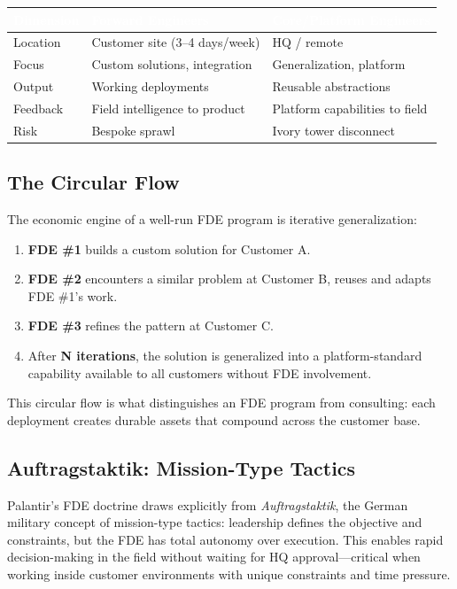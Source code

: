 \begin{center}
\begin{tabular}{L{3cm}L{5cm}L{5cm}}
\toprule
{}
\textcolor{white}{\textbf{Dimension}} &
\textcolor{white}{\textbf{Forward Engineers}} &
\textcolor{white}{\textbf{Core/Platform Engineers}} \\
\midrule
Location & Customer site (3--4 days/week) & HQ / remote \\
Focus & Custom solutions, integration & Generalization, platform \\
Output & Working deployments & Reusable abstractions \\
Feedback & Field intelligence to product & Platform capabilities to field \\
Risk & Bespoke sprawl & Ivory tower disconnect \\
\bottomrule
\end{tabular}
\end{center}

\subsection{The Circular Flow}

The economic engine of a well-run FDE program is iterative generalization:

\begin{enumerate}
    \item \textbf{FDE \#1} builds a custom solution for Customer A.
    \item \textbf{FDE \#2} encounters a similar problem at Customer B,
        reuses and adapts FDE \#1's work.
    \item \textbf{FDE \#3} refines the pattern at Customer C.
    \item After \textbf{N iterations}, the solution is generalized into a
        platform-standard capability available to all customers without
        FDE involvement.
\end{enumerate}

This circular flow is what distinguishes an FDE program from consulting:
each deployment creates durable assets that compound across the customer
base.

\subsection{Auftragstaktik: Mission-Type Tactics}

Palantir's FDE doctrine draws explicitly from \textit{Auftragstaktik},
the German military concept of mission-type tactics: leadership defines
the objective and constraints, but the FDE has total autonomy over
execution. This enables rapid decision-making in the field without
waiting for HQ approval---critical when working inside customer
environments with unique constraints and time pressure.

